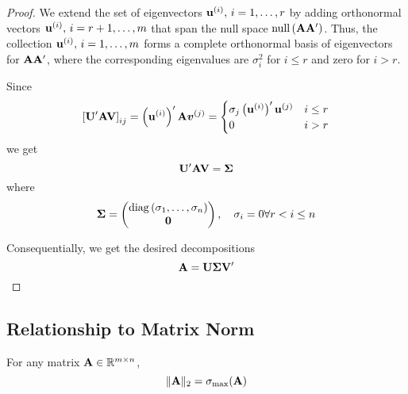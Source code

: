 \begin{proof}
	We extend the set of eigenvectors \(\mathbf{u}^{(i)},\,i=1,\ldots,r\) by adding orthonormal vectors \(\mathbf{u}^{(i)},\,i=r+1,\ldots,m\) that span the null space \(\operatorname{null}\left(\mathbf{A}\mathbf{A}^{\prime}\right)\). Thus, the collection \(\mathbf{u}^{(i)},\,i=1,\ldots,m\) forms a complete orthonormal basis of eigenvectors for \(\mathbf{A}\mathbf{A}^{\prime}\), where the corresponding eigenvalues are \(\sigma_{i}^{2}\) for \(i\leq r\) and zero for \(i>r\).

	Since
	\begin{equation*}
		\left[\mathbf{U}^{\prime}\mathbf{A}\mathbf{V}\right]_{ij}=\left(\mathbf{u}^{(i)}\right)^{\prime}\mathbf{A}\boldsymbol{v}^{(j)}=\begin{cases}\sigma_{j}\left(\mathbf{u}^{(i)}\right)^{\prime}\mathbf{u}^{(j)} & i \leq r \\ 0 & i>r\end{cases}
	\end{equation*}
	we get
	\begin{equation*}
		\mathbf{U}^{\prime}\mathbf{A}\mathbf{V}=\boldsymbol{\Sigma}
	\end{equation*}
	where
	\begin{equation*}
		\boldsymbol{\Sigma}=\begin{pmatrix}
			\operatorname{diag}\left(\sigma_{1},\ldots,\sigma_{n}\right) \\
			\mathbf{0}
		\end{pmatrix}
		,\quad\sigma_{i}=0\forall r<i\leq n
	\end{equation*}

	Consequentially, we get the desired decompositions
	\begin{equation*}
		\mathbf{A}=\mathbf{U}\boldsymbol{\Sigma}\mathbf{V}^{\prime}
	\end{equation*}
\end{proof}

\subsection{Relationship to Matrix Norm}

\begin{theorem}
	For any matrix \(\mathbf{A}\in\mathbb{R}^{m\times n}\),
	\begin{equation}
		\|\mathbf{A}\|_{2}=\sigma_{\max}(\mathbf{A})
	\end{equation}
\end{theorem}


